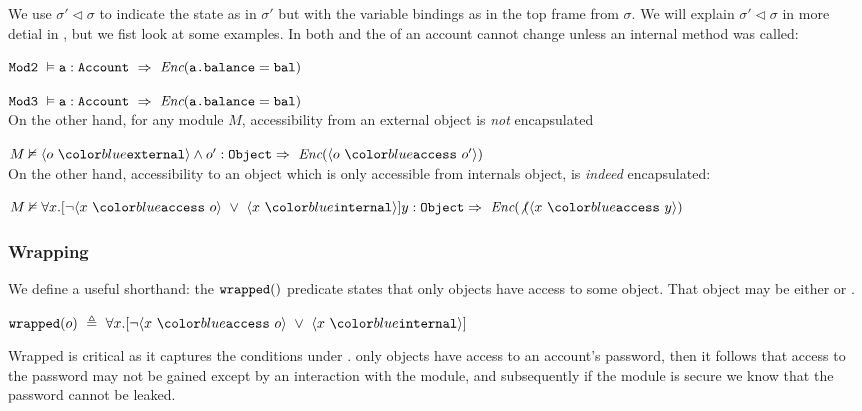 We use ${\sigma' \triangleleft \sigma}$ to indicate the state as in $\sigma'$ but
with the variable bindings as in the top frame from $\sigma$. We will explain 
${\sigma' \triangleleft \sigma}$ in more detial in , but 
we fist look at some examples.
In both  and  the  of an account cannot change
unless an internal method was called:
\\
\strut \hspace{1cm}
$\prg{Mod2}\ \vDash \prg{a}:\prg{Account}\ \Rightarrow\ \encaps{\prg{a.balance}=\prg{bal}}$
\\
\strut \hspace{1cm}
$\prg{Mod3}\ \vDash \prg{a}:\prg{Account}\ \Rightarrow\ \encaps{\prg{a.balance}=\prg{bal}}$
\\
On the other hand, for any module $M$, accessibility from an external object is \emph{not} encapsulated
\\
\strut \hspace{1cm}
$M \nvDash {\external o} \wedge o':\prg{Object} \Rightarrow\ {\encaps{\access{o}{o'}}}$
\\
On the other hand, accessibility to an object which is only accessible from internals object, is \emph{indeed} encapsulated:
\\
\strut \hspace{1cm}
$M \nvDash \all{x}{\neg \access{x}{o}\ \vee\ \internal{x}} y:\prg{Object} \Rightarrow\ {\encaps{\not(\access{x}{y}}}$


\subsubsection{Wrapping}

We define a useful shorthand: the $\texttt{wrapped}(  )$ predicate  states 
that only \internalO objects have access to some object.
That object may be either \internalO or \externalO.
\begin{definition}[Wrapped]
$\wrapped{o}\ \triangleq\ \all{x}{\neg \access{x}{o}\ \vee\ \internal{x}}$
\end{definition}
Wrapped is critical as it captures the conditions under . 
 only \internalO
objects have access to an account's password, then
it follows that access to the password may not 
be gained except by an interaction with the \internalM
module, and subsequently if the \internalM module
is secure we know that the password cannot be leaked.
 

